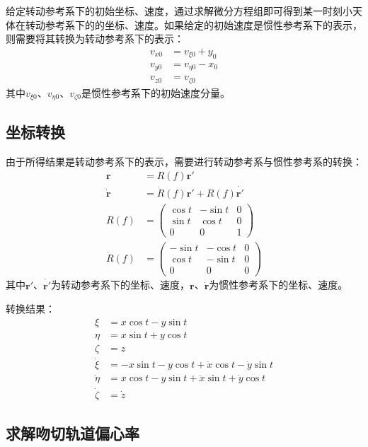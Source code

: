 给定转动参考系下的初始坐标、速度，通过求解微分方程组即可得到某一时刻小天体在转动参考系下的的坐标、速度。如果给定的初始速度是惯性参考系下的表示，则需要将其转换为转动参考系下的表示：
\begin{align}
    v_{x0}&=v_{\xi0}+y_0
    \\v_{y0}&=v_{\eta0}-x_0
    \\v_{z0}&=v_{\zeta0}
\end{align}
其中$v_{\xi0}$、$v_{\eta0}$、$v_{\zeta0}$是惯性参考系下的初始速度分量。

\subsection{坐标转换}

由于所得结果是转动参考系下的表示，需要进行转动参考系与惯性参考系的转换：
\begin{align}
    \boldsymbol{r}&=R(f)\boldsymbol{r'}
    \\\dot{\boldsymbol{r}}&=\dot{R}(f)\boldsymbol{r'}+R(f)\dot{\boldsymbol{r'}}
    \\R(f)&=
        \left(
        \begin{matrix}
        \cos t & -\sin t & 0\\
        \sin t & \cos t & 0\\
        0 & 0 & 1
        \end{matrix}
    \right)
    \\\dot{R}(f)&=
        \begin{pmatrix}
        -\sin t & -\cos t & 0\\
        \cos t & -\sin t & 0\\
        0 & 0 & 0
        \end{pmatrix}
\end{align}
其中$\boldsymbol{r'}$、$\dot{\boldsymbol{r'}}$为转动参考系下的坐标、速度，$\boldsymbol{r}$、$\dot{\boldsymbol{r}}$为惯性参考系下的坐标、速度。

转换结果：
\begin{align}
   \xi&=x\cos t-y\sin t
    \\\eta&=x\sin t+y\cos t
    \\\zeta&=z
    \\\dot{\xi}&=-x\sin t-y\cos t+\dot{x}\cos t-\dot{y}\sin t
    \\\dot{\eta}&=x\cos t-y\sin t+\dot{x}\sin t+\dot{y}\cos t
    \\\dot{\zeta}&=\dot{z}
\end{align}

\subsection{求解吻切轨道偏心率}

